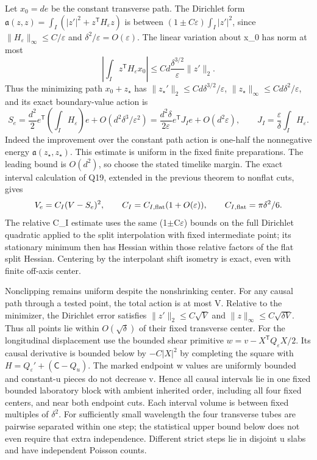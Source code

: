\documentclass[11pt]{article}
\begin{document}
Let \(x_0=de\) be the constant transverse path. The Dirichlet form \(\mathfrak a(z,z)=\int_I(|z'|^2+z^{\mathsf T}H_\varepsilon z)\) is between \((1\pm C\varepsilon)\int_I|z'|^2\), since \(\|H_\varepsilon\|_\infty\le C/\varepsilon\) and \(\delta^2/\varepsilon=O(\varepsilon)\). The linear variation about x\_0 has norm at most
\[
 \left|\int_I z^{\mathsf T}H_\varepsilon x_0\right|
 \le C d\frac{\delta^{3/2}}\varepsilon\|z'\|_2.
\]
Thus the minimizing path \(x_0+z_\star\) has \(\|z_\star'\|_2\le C d\delta^{3/2}/\varepsilon\), \(\|z_\star\|_\infty\le Cd\delta^2/\varepsilon\), and its exact boundary-value action is
\[
 S_e=\frac{d^2}2 e^{\mathsf T}\left(\int_I H_\varepsilon\right)e
         +O(d^2\delta^3/\varepsilon^2)
     =\frac{d^2\delta}{2\varepsilon}e^{\mathsf T}J_I e+O(d^2\varepsilon),
 \qquad J_I=\frac\varepsilon\delta\int_I H_\varepsilon .
\]
Indeed the improvement over the constant path action is one-half the nonnegative energy \(\mathfrak a(z_\star,z_\star)\). This estimate is uniform in the fixed finite preparations. The leading bound is \(O(d^2)\), so choose the stated timelike margin. The exact interval calculation of Q19, extended in the previous theorem to nonflat cuts, gives
\[
 V_e=C_I(V-S_e)^2,\qquad
 C_I=C_{I,\rm flat}(1+O(\varepsilon)),\qquad
 C_{I,\rm flat}=\pi\delta^2/6.
\]
The relative C\_I estimate uses the same (1\(\pm\)C\(\varepsilon\)) bounds on the full Dirichlet quadratic applied to the split interpolation with fixed intermediate point; its stationary minimum then has Hessian within those relative factors of the flat split Hessian. Centering by the interpolant shift isometry is exact, even with finite off-axis center.

Nonclipping remains uniform despite the nonshrinking center. For any causal path through a tested point, the total action is at most V. Relative to the minimizer, the Dirichlet error satisfies \(\|z'\|_2\le C\sqrt V\) and \(\|z\|_\infty\le C\sqrt{\delta V}\). Thus all points lie within \(O(\sqrt\delta)\) of their fixed transverse center. For the longitudinal displacement use the bounded shear primitive \(w=v-X^{\mathsf T}Q_\varepsilon X/2\). Its causal derivative is bounded below by \(-C|X|^2\) by completing the square with \(H=Q_\varepsilon'+(\mathsf C-Q_u)\). The marked endpoint w values are uniformly bounded and constant-u pieces do not decrease v. Hence all causal intervals lie in one fixed bounded laboratory block with ambient inherited order, including all four fixed centers, and near both endpoint cuts. Each interval volume is between fixed multiples of \(\delta^2\). For sufficiently small wavelength the four transverse tubes are pairwise separated within one step; the statistical upper bound below does not even require that extra independence. Different strict steps lie in disjoint u slabs and have independent Poisson counts.
\end{document}
